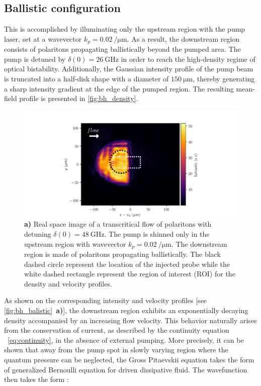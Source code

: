 \subsection{Ballistic configuration}
\label{sec:ballistic_configuration}
This is accomplished by illuminating only the upstream region with the pump laser, set at a wavevector \(k_p = \SI{0.02}{\per \micro \meter}\). As a result, the downstream region consists of polaritons propagating ballistically beyond the pumped area.
The pump is detuned by \(\delta(0) = \SI{26}{\giga \hertz}\) in order to reach the high-density regime of optical bistability. Additionally, the Gaussian intensity profile of the pump beam is truncated into a half-disk shape with a diameter of \(\SI{150}{\micro \meter}\), thereby generating a sharp intensity gradient at the edge of the pumped region. 
The resulting mean-field profile is presented in \autoref{fig:bh_density}.

\begin{figure}[htbp]
    \centering
    \includegraphics[width=1\textwidth]{chap_stimulated_hawking/fig/bh_density.pdf}
    \caption{\textbf{a)} Real space image of a transcritical flow of polaritons with detuning $\delta(0)=\SI{48}{\giga\hertz}$. The pump is shinned only 
    in the upstream region with wavevector $k_p=\SI{0.02}{\per \micro \meter}$.
    The downstream region is made of polaritons propagating ballistically. The black dashed circle represent the location of the injected probe while the white dashed rectangle represent the region 
    of interest (ROI) for the density and velocity profiles. }
    \label{fig:bh_density}
\end{figure}

As shown on the corresponding intensity and velocity profiles [see \autoref{fig:bh_balistic}~\textbf{a)}], the downstream region exhibits an exponentially decaying density accompanied by an increasing flow velocity. 
This behavior naturally arises from the conservation of current, as described by the continuity equation ~\ref{eq:continuity}, in the absence of external pumping. More precisely, it can be shown that 
away from the pump spot in slowly varying region where the quantum pressure can be neglected, the Gross Pitaevskii equation takes the form of generalized Bernoulli equation for driven dissipative fluid. The wavefunction then takes the form \cite{carusotto_inhomogeneous_2008}: 

